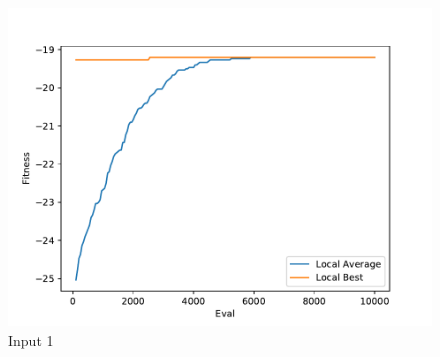 \documentclass{standalone}
\begin{document}
\begin{figure}[!htb]
	\caption{Input 1}
	\label{fig:graph_1051}
	\includegraphics[width=\textwidth]{../graphs/graphs/1051.pdf}
\end{figure}
\end{document}
